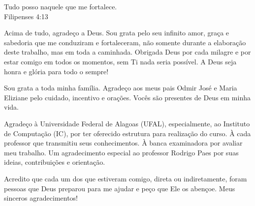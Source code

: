 \documentclass{ppgi}
\begin{document}
\imprimircapa
\imprimirfolhaderosto

\begin{dedicatoria}
\prededicatoria

\begin{flushright}
Tudo posso naquele que me fortalece.\\
Filipenses 4:13
\end{flushright}

\end{dedicatoria}

\begin{agradecimentos}

Acima de tudo, agradeço a Deus. Sou grata pelo seu infinito amor, graça e sabedoria que me conduziram e fortaleceram, não somente durante a elaboração deste trabalho, mas em toda a caminhada. Obrigada Deus por cada milagre e por estar comigo em todos os momentos, sem Ti nada seria possível. A Deus seja honra e glória para todo o sempre!

Sou grata a toda minha família. Agradeço aos meus pais Odmir José e Maria Eliziane pelo cuidado, incentivo e orações. Vocês são presentes de Deus em minha vida. 

Agradeço à Universidade Federal de Alagoas (UFAL), especialmente, ao Instituto de Computação (IC), por ter oferecido estrutura para realização do curso. À cada professor que transmitiu seus conhecimentos. À banca examinadora por avaliar meu trabalho. Um agradecimento especial ao professor Rodrigo Paes por suas ideias, contribuições e orientação.

Acredito que cada um dos que estiveram comigo, direta ou indiretamente, foram pessoas que Deus preparou para me ajudar e peço que Ele os abençoe.
Meus sinceros agradecimentos!

\end{agradecimentos}
\end{document}
